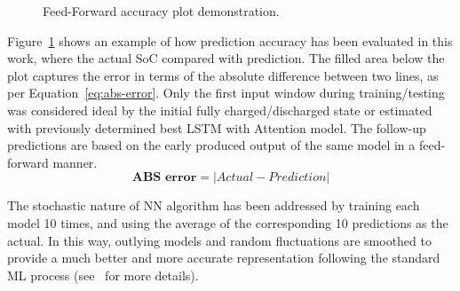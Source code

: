 %
%
 {
\begin{figure}[ht]
    \centering
    
    \caption{Feed-Forward accuracy plot demonstration.}
    \label{fig:plot_demo}
\end{figure}
Figure~\ref{fig:plot_demo} shows an example of how prediction accuracy has been evaluated in this work, where the actual SoC compared with prediction.
The filled area below the plot captures the error in terms of the absolute difference between two lines, as per Equation~\ref{eq:abs-error}.
Only the first input window during training/testing was considered ideal by the initial fully charged/discharged state or estimated with previously determined best LSTM with Attention model.
The follow-up predictions are based on the early produced output of the same model in a feed-forward manner.
\begin{equation}
    \textbf{ABS error}  = \left | Actual-Prediction \right |
    \label{eq:abs-error}
\end{equation}
}
{The stochastic nature of NN algorithm has been addressed by training each model 10 times, and using the average of the corresponding 10 predictions as the actual.
In this way, outlying models and random fluctuations are smoothed to provide a much better and more accurate representation following the standard ML process (see~\cite{sadykov_practical_2022} for more details).}
